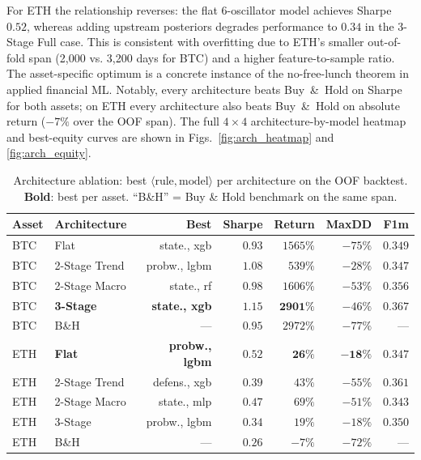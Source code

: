 \documentclass[conference]{IEEEtran}
\begin{document}
For ETH the relationship reverses: the flat 6-oscillator model achieves Sharpe $0.52$, whereas adding upstream posteriors degrades performance to $0.34$ in the 3-Stage Full case. This is consistent with overfitting due to ETH's smaller out-of-fold span (2{,}000 vs. 3{,}200 days for BTC) and a higher feature-to-sample ratio. The asset-specific optimum is a concrete instance of the no-free-lunch theorem in applied financial ML. Notably, every architecture beats Buy~\&~Hold on Sharpe for both assets; on ETH every architecture also beats Buy~\&~Hold on absolute return ($-7\%$ over the OOF span). The full $4 \times 4$ architecture-by-model heatmap and best-equity curves are shown in Figs.~\ref{fig:arch_heatmap} and \ref{fig:arch_equity}.

\begin{table}[t]
\centering
\caption{Architecture ablation: best $\langle\text{rule}, \text{model}\rangle$ per architecture on the OOF backtest. \textbf{Bold}: best per asset. ``B\&H'' = Buy \& Hold benchmark on the same span.}
\label{tab:arch}
\setlength{\tabcolsep}{6pt}
\renewcommand{\arraystretch}{1.05}
\begin{tabular}{@{}llrrrrr@{}}
\toprule
Asset & Architecture & Best & Sharpe & Return & MaxDD & F1m \\
\midrule
BTC & Flat            & state., xgb     & $0.93$ & $1565\%$  & $-75\%$ & $0.349$ \\
BTC & 2-Stage Trend   & probw., lgbm    & $1.08$ & $539\%$   & $-28\%$ & $0.347$ \\
BTC & 2-Stage Macro   & state., rf      & $0.98$ & $1606\%$  & $-53\%$ & $0.356$ \\
BTC & \textbf{3-Stage}& \textbf{state., xgb} & $\mathbf{1.15}$ & $\mathbf{2901\%}$ & $-46\%$ & $\mathbf{0.367}$ \\
BTC & B\&H            & ---             & $0.95$ & $2972\%$  & $-77\%$ & ---     \\
\midrule
ETH & \textbf{Flat}   & \textbf{probw., lgbm} & $\mathbf{0.52}$ & $\mathbf{26\%}$ & $\mathbf{-18\%}$ & $0.347$ \\
ETH & 2-Stage Trend   & defens., xgb    & $0.39$ & $43\%$    & $-55\%$ & $0.361$ \\
ETH & 2-Stage Macro   & state., mlp     & $0.47$ & $69\%$    & $-51\%$ & $0.343$ \\
ETH & 3-Stage         & probw., lgbm    & $0.34$ & $19\%$    & $-18\%$ & $0.350$ \\
ETH & B\&H            & ---             & $0.26$ & $-7\%$    & $-72\%$ & ---     \\
\bottomrule
\end{tabular}
\end{table}
\end{document}
